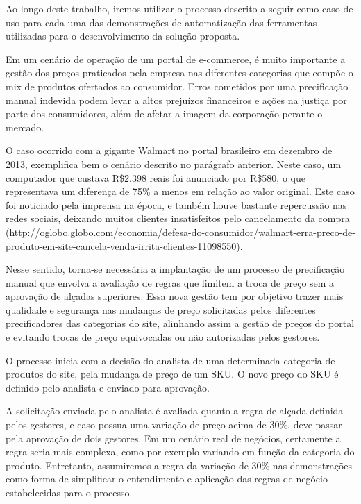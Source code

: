 Ao longo deste trabalho, iremos utilizar o processo descrito a seguir como caso de uso para cada uma das demonstrações de automatização das ferramentas utilizadas para o desenvolvimento da solução proposta.

Em um cenário de operação de um portal de e-commerce, é muito importante a gestão dos preços praticados pela empresa nas diferentes categorias que compõe o mix de produtos ofertados ao consumidor. Erros cometidos por uma precificação manual indevida podem levar a altos prejuízos financeiros e ações na justiça por parte dos consumidores, além de afetar a imagem da corporação perante o mercado. 

O caso ocorrido com a gigante Walmart no portal brasileiro em dezembro de 2013, exemplifica bem o cenário descrito no parágrafo anterior. Neste caso, um computador que custava R\$2.398 reais foi anunciado por R\$580, o que representava um diferença de 75\% a menos em relação ao valor original. Este caso foi noticiado pela imprensa na época, e também houve bastante repercussão nas redes sociais, deixando muitos clientes insatisfeitos pelo cancelamento da compra (http://oglobo.globo.com/economia/defesa-do-consumidor/walmart-erra-preco-de-produto-em-site-cancela-venda-irrita-clientes-11098550). 

Nesse sentido, torna-se necessária a implantação de um processo de precificação manual que envolva a avaliação de regras que limitem a troca de preço sem a aprovação de alçadas superiores. Essa nova gestão tem por objetivo trazer mais qualidade e segurança nas mudanças de preço solicitadas pelos diferentes precificadores das categorias do site, alinhando assim a gestão de preços do portal e evitando trocas de preço equivocadas ou não autorizadas pelos gestores.

O processo inicia com a decisão do analista de uma determinada categoria de produtos do site, pela mudança de preço de um SKU. O novo preço do SKU é definido pelo analista e enviado para aprovação.

A solicitação enviada pelo analista é avaliada quanto a regra de alçada definida pelos gestores, e caso possua uma variação de preço acima de 30\%, deve passar pela aprovação de dois gestores. Em um cenário real de negócios, certamente a regra seria mais complexa, como por exemplo variando em função da categoria do produto. Entretanto, assumiremos a regra da variação de 30\% nas demonstrações como forma de simplificar o entendimento e aplicação das regras de negócio estabelecidas para o processo.

